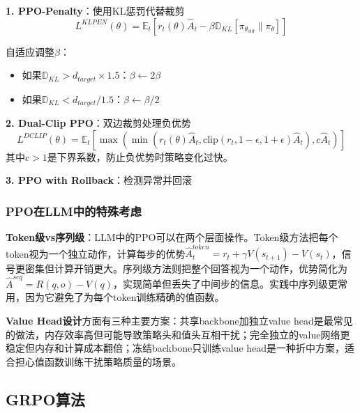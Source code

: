 \documentclass[12pt,a4paper]{article}
\newenvironment{algorithmic}[1][]%
      {\begin{list}{}{\leftmargin=2em\itemsep=0.2em\parsep=0pt\topsep=0.2em}}%
      {\end{list}}
\newcommand{\STATE}{\item[]}
\newcommand{\IF}[1]{\item[]\textbf{if} ##1 \textbf{then}}
\newcommand{\ENDIF}{\item[]\textbf{end if}}
\begin{document}
\textbf{1. PPO-Penalty}：使用KL惩罚代替裁剪
\begin{equation}
L^{KLPEN}(\theta) = \mathbb{E}_t\left[r_t(\theta)\hat{A}_t - \beta \mathbb{D}_{KL}[\pi_{\theta_{old}} \| \pi_\theta]\right]
\end{equation}

自适应调整$\beta$：
\begin{itemize}
    \item 如果$\mathbb{D}_{KL} > d_{target} \times 1.5$：$\beta \leftarrow 2\beta$
    \item 如果$\mathbb{D}_{KL} < d_{target} / 1.5$：$\beta \leftarrow \beta/2$
\end{itemize}

\textbf{2. Dual-Clip PPO}：双边裁剪处理负优势
\begin{equation}
L^{DCLIP}(\theta) = \mathbb{E}_t\left[\max\left(\min\left(r_t(\theta)\hat{A}_t, \text{clip}(r_t, 1-\epsilon, 1+\epsilon)\hat{A}_t\right), c\hat{A}_t\right)\right]
\end{equation}
其中$c > 1$是下界系数，防止负优势时策略变化过快。

\textbf{3. PPO with Rollback}：检测异常并回滚

\subsubsection{PPO在LLM中的特殊考虑}

\textbf{Token级vs序列级}：LLM中的PPO可以在两个层面操作。Token级方法把每个token视为一个独立动作，计算每步的优势$\hat{A}_t^{token} = r_t + \gamma V(s_{t+1}) - V(s_t)$，信号更密集但计算开销更大。序列级方法则把整个回答视为一个动作，优势简化为$\hat{A}^{seq} = R(q, o) - V(q)$，实现简单但丢失了中间步的信息。实践中序列级更常用，因为它避免了为每个token训练精确的值函数。

\textbf{Value Head设计}方面有三种主要方案：共享backbone加独立value head是最常见的做法，内存效率高但可能导致策略头和值头互相干扰；完全独立的value网络更稳定但内存和计算成本翻倍；冻结backbone只训练value head是一种折中方案，适合担心值函数训练干扰策略质量的场景。

\subsection{GRPO算法}
\end{document}
